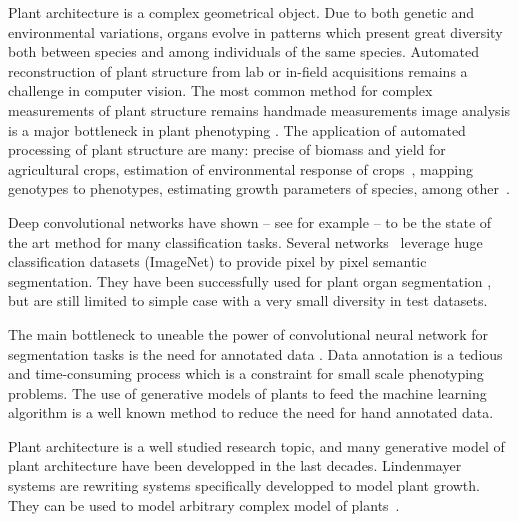 Plant architecture is a complex geometrical object. Due to both genetic and
environmental variations, organs evolve in patterns which present great diversity
both between species and among individuals of the same species. Automated
reconstruction of plant structure from lab or in-field acquisitions remains a challenge in computer
vision. The most common method for complex measurements of plant structure
remains handmade measurements image analysis is a major bottleneck in plant phenotyping
\cite{minervini2015image}. The application of automated processing of plant structure are many: precise
 of biomass and yield for agricultural crops, estimation of environmental response
of crops~\cite{peirone2018assessing, srivastava2017drought},  mapping genotypes to
phenotypes, estimating growth parameters of species, among other~\cite{denis1998symmetry}.

Deep convolutional networks have shown -- see for example \cite{krizhevsky2012imagenet} --
to be the state of the art method for many classification tasks. Several
networks~\cite{ronneberger2015u, long2015fully} leverage huge classification datasets (ImageNet) to provide pixel by
pixel semantic segmentation. They have been successfully used for plant organ
segmentation \cite{shi2019plant}, but are still limited to simple case with a very
small diversity in test datasets.

The main bottleneck to uneable the power of convolutional neural network for segmentation
tasks is the need for annotated data . Data annotation is a tedious and time-consuming process
which is a constraint for small scale phenotyping problems. The use of generative
models of plants to feed the machine learning algorithm is a well known method to
reduce the need for hand annotated data.

Plant architecture is a well studied research topic, and many generative model
of plant architecture have been developped in the last decades. Lindenmayer
systems are rewriting systems specifically developped to model plant growth.
They can be used to model arbitrary complex model of plants~\cite{boudon_l-py:_2012}.

